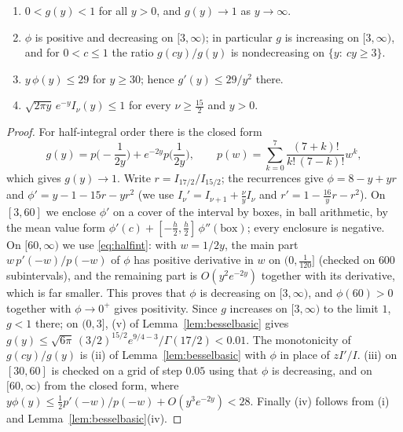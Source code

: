 \begin{lemma}\label{lem:gfacts}
\begin{enumerate}
\item[(i)] $0<g(y)<1$ for all $y>0$, and $g(y)\to1$ as $y\to\infty$.
\item[(ii)] $\phi$ is positive and decreasing on $[3,\infty)$; in particular $g$ is increasing on $[3,\infty)$, and for $0<c\le1$ the ratio $g(cy)/g(y)$ is nondecreasing on $\{y:\ cy\ge3\}$.
\item[(iii)] $y\,\phi(y)\le29$ for $y\ge30$; hence $g'(y)\le29/y^2$ there.
\item[(iv)] $\sqrt{2\pi y}\,e^{-y}I_\nu(y)\le1$ for every $\nu\ge\frac{15}2$ and $y>0$.
\end{enumerate}
\end{lemma}

\begin{proof}
For half-integral order there is the closed form \cite[\S3.71]{Wat44}
\begin{equation}\label{eq:halfint}
g(y)=p\Big(-\frac1{2y}\Big)+e^{-2y}p\Big(\frac1{2y}\Big),\qquad p(w)=\sum_{k=0}^7\frac{(7+k)!}{k!\,(7-k)!}w^k ,
\end{equation}
which gives $g(y)\to1$. Write $r=I_{17/2}/I_{15/2}$; the recurrences give $\phi=8-y+yr$ and $\phi'=y-1-15r-yr^2$ (we use $I_\nu'=I_{\nu+1}+\frac\nu yI_\nu$ and $r'=1-\frac{16}yr-r^2$). On $[3,60]$ we enclose $\phi'$ on a cover of the interval by boxes, in ball arithmetic, by the mean value form $\phi'(c)+[-\frac h2,\frac h2]\,\phi''(\text{box})$; every enclosure is negative. On $[60,\infty)$ we use \eqref{eq:halfint}: with $w=1/2y$, the main part $w\,p'(-w)/p(-w)$ of $\phi$ has positive derivative in $w$ on $(0,\frac1{120}]$ (checked on $600$ subintervals), and the remaining part is $O(y^2e^{-2y})$ together with its derivative, which is far smaller. This proves that $\phi$ is decreasing on $[3,\infty)$, and $\phi(60)>0$ together with $\phi\to0^+$ gives positivity. Since $g$ increases on $[3,\infty)$ to the limit $1$, $g<1$ there; on $(0,3]$, (v) of Lemma~\ref{lem:besselbasic} gives $g(y)\le\sqrt{6\pi}\,(3/2)^{15/2}e^{9/4-3}/\Gamma(17/2)<0.01$. The monotonicity of $g(cy)/g(y)$ is (ii) of Lemma~\ref{lem:besselbasic} with $\phi$ in place of $zI'/I$. (iii) on $[30,60]$ is checked on a grid of step $0.05$ using that $\phi$ is decreasing, and on $[60,\infty)$ from the closed form, where $y\phi(y)\le\frac12p'(-w)/p(-w)+O(y^3e^{-2y})<28$. Finally (iv) follows from (i) and Lemma~\ref{lem:besselbasic}(iv).
\end{proof}

